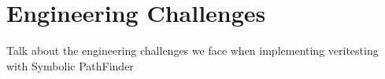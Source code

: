 \section{Engineering Challenges}
Talk about the engineering challenges we face when implementing veritesting with Symbolic PathFinder
